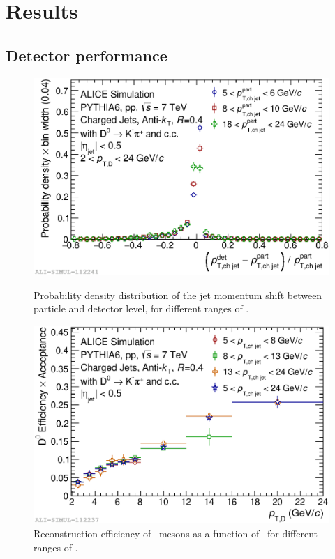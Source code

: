 \documentclass[a4paper]{jpconf}
\begin{document}
\section{Results}

\subsection{Detector performance}
\label{sect:detperf}
\begin{figure}[tb]
\centering
\begin{minipage}{.48\textwidth}
\includegraphics[width=\textwidth]{img/HQ16_Simulation_DetectorResponse}
\caption{\label{fig:HQ16_Simulation_DetectorResponse} Probability density distribution of the jet momentum shift between particle and detector level, for different ranges of \ptchjet.}
\end{minipage}\hspace{1pc}%
\begin{minipage}{.48\textwidth}
\includegraphics[width=\textwidth]{img/HQ16_Simulation_EfficiencyVsDPt}
\caption{\label{fig:HQ16_Simulation_EfficiencyVsDPt}Reconstruction efficiency of \Dzero\ mesons as a function of \ptd\ for different ranges of \ptchjet.}
\end{minipage} 
\end{figure}
\end{document}
